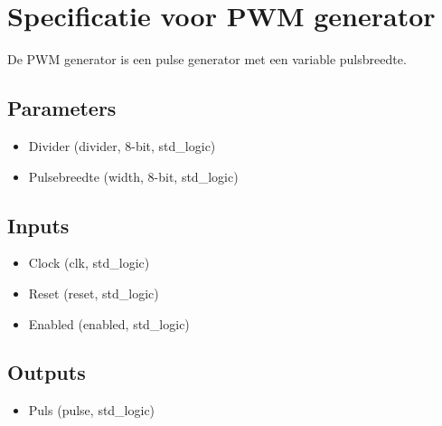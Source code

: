 \documentclass{article}
\begin{document}
\section{Specificatie voor PWM generator}
De PWM generator is een pulse generator met een variable pulsbreedte.
\subsection{Parameters}
\begin{itemize}
\item Divider (divider, 8-bit, std\_logic)
\item Pulsebreedte (width, 8-bit, std\_logic)
\end{itemize}
\subsection{Inputs}
\begin{itemize}
\item Clock (clk, std\_logic)
\item Reset (reset, std\_logic)
\item Enabled (enabled, std\_logic)
\end{itemize}
\subsection{Outputs}
\begin{itemize}
\item Puls (pulse, std\_logic)
\end{itemize}
\end{document}
